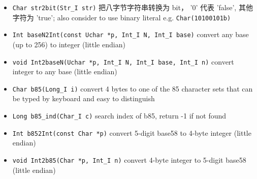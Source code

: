 \begin{itemize}
\item \verb|Char str2bit(Str_I str)| 把八字节字符串转换为 bit， '0' 代表 'false', 其他字符为 'true'; also consider to use binary literal e.g. \verb`Char(10100101b)`
\item \verb|Int baseN2Int(const Uchar *p, Int_I N, Int_I base)| convert any base (up to 256) to integer (little endian)
\item \verb|void Int2baseN(Uchar *p, Int_I N, Int_I base, Int_I n)| convert integer to any base (little endian)
\item \verb|Char b85(Long_I i)| convert 4 bytes to one of the 85 character sets that can be typed by keyboard and easy to distinguish
\item \verb|Long b85_ind(Char_I c)| search index of b85, return -1 if not found
\item \verb|Int b852Int(const Char *p)| convert 5-digit base58 to 4-byte integer (little endian)
\item \verb|void Int2b85(Char *p, Int_I n)| convert 4-byte integer to 5-digit base58 (little endian)
\end{itemize}

